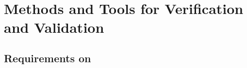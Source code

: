 \documentclass{../template/openetcs_report}
\begin{document}




\part{Methods and Tools for Verification and Validation}
\label{sec:methods-and-tools}







\appendix

\chapter{Requirements on \VV}
\label{sec:appendix}





\nocite{*}
\end{document}
